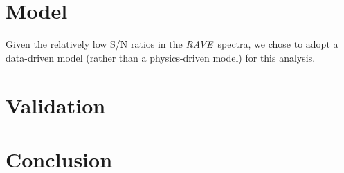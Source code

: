 \documentclass[preprint,trackchanges]{aastex}
\newcommand{\project}[1]{\textsl{#1}}
\newcommand{\acronym}[1]{{\small{#1}}}
\newcommand{\rave}{\project{\acronym{RAVE}}}
\newcommand{\logg}{\log g}
\newcommand{\teff}{T_{\mathrm{eff}}}
\newcommand{\Nstars}{483,330}
\begin{document}
\section{Model}
\label{sec:model}

Given the relatively low S/N ratios in the \rave\ spectra, we chose to adopt a 
data-driven model (rather than a physics-driven model) for this analysis.









\section{Validation}
\label{sec:validation}






\section{Conclusion}
\label{sec:conclusion}

\end{document}

